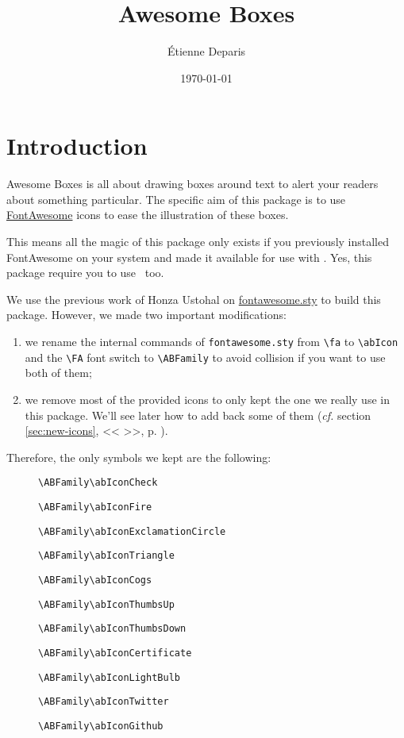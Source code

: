 \documentclass[a4paper,12pt]{article}
\title{Awesome Boxes}
\author{Étienne Deparis}
\date{\today}
\newcommand{\cf}[1]{(\emph{cf.} section \ref{#1}, %
  <<\,\nameref{#1}\,>>, p. \pageref{#1})}
\newcommand\hrefcolor[2]{\textcolor{magenta}{\href{#1}{#2}}}
\begin{document}
\maketitle

\section{Introduction}

Awesome Boxes is all about drawing boxes around text to alert your
readers about something particular. The specific aim of this package is
to use \hrefcolor{http://fontawesome.io/icons/}{FontAwesome} icons to ease
the illustration of these boxes.

This means all the magic of this package only exists if you previously
installed FontAwesome on your system and made it available for use with
\XeTeX. Yes, this package require you to use \XeLaTeX\ too.

We use the previous work of Honza Ustohal on
\hrefcolor{https://gist.github.com/sway/3101743}{fontawesome.sty} to
build this package. However, we made two important modifications:

\begin{enumerate}
\item we rename the internal commands of \texttt{fontawesome.sty} from
  \texttt{\textbackslash{}fa} to \texttt{\textbackslash{}abIcon} and the
  \texttt{\textbackslash{}FA} font switch to
  \texttt{\textbackslash{}ABFamily} to avoid collision if you want to
  use both of them;
\item we remove most of the provided icons to only kept the one we
  really use in this package. We'll see later how to add back some of
  them \cf{sec:new-icons}.
\end{enumerate}

Therefore, the only symbols we kept are the following:

\begin{description}
  \item[{\ABFamily\abIconCheck}] \verb!\ABFamily\abIconCheck!
  \item[{\ABFamily\abIconFire}] \verb!\ABFamily\abIconFire!
  \item[{\ABFamily\abIconExclamationCircle}] \verb!\ABFamily\abIconExclamationCircle!
  \item[{\ABFamily\abIconExclamationTriangle}] \verb!\ABFamily\abIconTriangle!
  \item[{\ABFamily\abIconCogs}] \verb!\ABFamily\abIconCogs!
  \item[{\ABFamily\abIconThumbsUp}] \verb!\ABFamily\abIconThumbsUp!
  \item[{\ABFamily\abIconThumbsDown}] \verb!\ABFamily\abIconThumbsDown!
  \item[{\ABFamily\abIconCertificate}] \verb!\ABFamily\abIconCertificate!
  \item[{\ABFamily\abIconLightBulb}] \verb!\ABFamily\abIconLightBulb!
  \item[{\ABFamily\abIconTwitter}] \verb!\ABFamily\abIconTwitter!
  \item[{\ABFamily\abIconGithub}] \verb!\ABFamily\abIconGithub!
\end{description}
\end{document}
